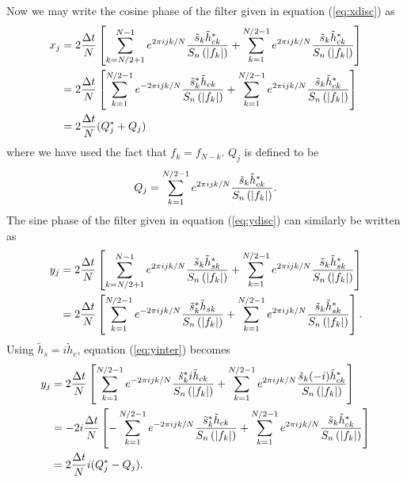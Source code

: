 Now we may write the cosine phase of the filter given in equation
(\ref{eq:xdisc}) as
\begin{equation}
\begin{split}
x_j &= 
2\frac{\Delta t}{N}
\left[
  \sum_{k=N/2+1}^{N-1} e^{2\pi ijk/N} 
  \frac{\tilde{s}_k \tilde{h}_{ck}^\ast}{S_n\left(\left|f_{k}\right|\right)}
  +
  \sum_{k=1}^{N/2-1} e^{2\pi ijk/N} 
  \frac{\tilde{s}_k \tilde{h}_{ck}^\ast}{S_n\left(\left|f_{k}\right|\right)}
\right] \\
&= 2\frac{\Delta t}{N}
\left[
  \sum_{k=1}^{N/2-1} e^{-2\pi ijk/N} 
  \frac{\tilde{s}_k^\ast \tilde{h}_{ck}}{S_n\left(\left|f_{k}\right|\right)}
  +
  \sum_{k=1}^{N/2-1} e^{2\pi ijk/N} 
  \frac{\tilde{s}_k \tilde{h}_{ck}^\ast}{S_n\left(\left|f_{k}\right|\right)}
\right] \\
&= 2\frac{\Delta t}{N}(Q_j^\ast + Q_j)
\end{split}
\end{equation}
where we have used the fact that $f_k = f_{N-k}$. $Q_j$ is defined to be
\begin{equation}
\label{eq:Qdef}
Q_j = \sum_{k=1}^{N/2-1} e^{2\pi ijk/N} 
  \frac{\tilde{s}_k \tilde{h}_{ck}^\ast}{S_n\left(\left|f_{k}\right|\right)}.
\end{equation}
The sine phase of the filter given in equation (\ref{eq:ydisc}) can similarly
be written as
\begin{equation}
\begin{split}
\label{eq:yinter}
y_j &=
2\frac{\Delta t}{N}
\left[
  \sum_{k=N/2+1}^{N-1} e^{2\pi ijk/N} 
  \frac{\tilde{s}_k \tilde{h}_{sk}^\ast}{S_n\left(\left|f_{k}\right|\right)}
  +
  \sum_{k=1}^{N/2-1} e^{2\pi ijk/N} 
  \frac{\tilde{s}_k \tilde{h}_{sk}^\ast}{S_n\left(\left|f_{k}\right|\right)}
\right] \\
&= 
2\frac{\Delta t}{N}
\left[
  \sum_{k=1}^{N/2-1} e^{-2\pi ijk/N} 
  \frac{\tilde{s}_k^\ast \tilde{h}_{sk}}{S_n\left(\left|f_{k}\right|\right)}
  +
  \sum_{k=1}^{N/2-1} e^{2\pi ijk/N} 
  \frac{\tilde{s}_k \tilde{h}_{sk}^\ast}{S_n\left(\left|f_{k}\right|\right)}
\right].
\end{split}
\end{equation}
Using $\tilde{h}_s = i \tilde{h}_c$, equation (\ref{eq:yinter}) becomes
\begin{equation}
\begin{split}
y_j &= 
2\frac{\Delta t}{N}
\left[
  \sum_{k=1}^{N/2-1} e^{-2\pi ijk/N} 
  \frac{\tilde{s}_k^\ast i\tilde{h}_{ck}}{S_n\left(\left|f_{k}\right|\right)}
  +
  \sum_{k=1}^{N/2-1} e^{2\pi ijk/N} 
  \frac{\tilde{s}_k (-i)\tilde{h}_{ck}^\ast}{S_n\left(\left|f_{k}\right|\right)}
\right] \\
& = 
-2i\frac{\Delta t}{N}
\left[
  - \sum_{k=1}^{N/2-1} e^{-2\pi ijk/N} 
  \frac{\tilde{s}_k^\ast \tilde{h}_{ck}}{S_n\left(\left|f_{k}\right|\right)}
  +
  \sum_{k=1}^{N/2-1} e^{2\pi ijk/N} 
  \frac{\tilde{s}_k \tilde{h}_{ck}^\ast}{S_n\left(\left|f_{k}\right|\right)}
\right] \\
& = 
2\frac{\Delta t}{N}i(Q_j^\ast - Q_j).
\end{split}
\end{equation}
